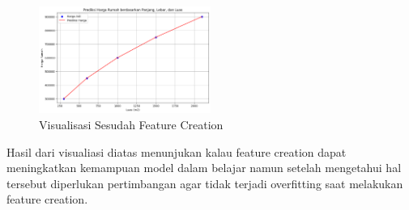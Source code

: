 \begin{figure}[H] %
    \centering
    \includegraphics[width=0.5\textwidth]{figure/output feature creation multiple feature.png}
    \caption{Visualisasi Sesudah Feature Creation}
    \label{fig:2.visualisasisesudahfeaturecreation}
\end{figure}
Hasil dari visualiasi diatas menunjukan kalau feature creation dapat meningkatkan kemampuan model dalam belajar namun setelah mengetahui hal tersebut diperlukan pertimbangan agar tidak terjadi overfitting saat melakukan feature creation.

